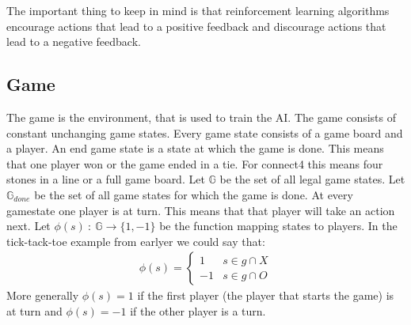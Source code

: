 \documentclass[12pt]{article}
\begin{document}
The important thing to keep in mind is that reinforcement learning algorithms encourage actions that lead to a positive feedback and discourage actions that lead to a negative feedback.
\subsection{Game}
The game is the environment, that is used to train the AI. The game consists of constant unchanging game states. Every game state consists of a game board and a player. An end game state is a state at which the game is done. This means that one player won or the game ended in a tie. For connect4 this means four stones in a line or a full game board.
Let \(\mathbb{G}\) be the set of all legal game states.
Let \(\mathbb{G}_{done}\) be the set of all game states for which the game is done. At every gamestate one player is at turn. This means that that player will take an action next. Let \(\phi(s)~:~\mathbb{G}\to\{1,-1\}\) be the function mapping states to players. In the tick-tack-toe example from earlyer we could say that:
\begin{align}
\phi(s) = \left\{\begin{matrix}
1 & s \in g\cap X\\
-1 & s \in g\cap O
\end{matrix}\right.
\end{align}
More generally \(\phi(s) = 1\) if the first player (the player that starts the game) is at turn and \(\phi(s) = -1\) if the other player is a turn.
\end{document}
